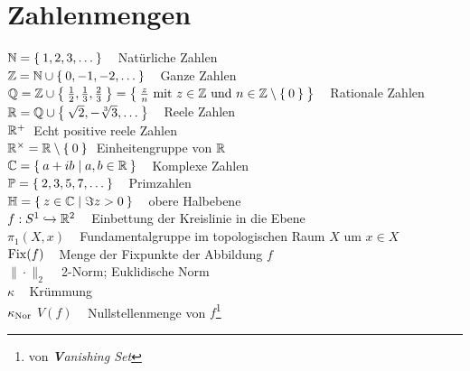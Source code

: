 \section*{Zahlenmengen}
$\mathbb{N} = \Set{1, 2, 3, \dots} \;\;\;$ Natürliche Zahlen\\
$\mathbb{Z} = \mathbb{N} \cup \Set{0, -1, -2, \dots} \;\;\;$ Ganze Zahlen\\
$\mathbb{Q} = \mathbb{Z} \cup \Set{\frac{1}{2}, \frac{1}{3}, \frac{2}{3}} = \Set{\frac{z}{n} \text{ mit } z \in \ensuremath{\mathbb{Z}}\text{ und } n \in \ensuremath{\mathbb{Z}}\setminus \Set{0}} \;\;\;$ Rationale Zahlen\\
$\mathbb{R} = \mathbb{Q} \cup \Set{\sqrt{2}, -\sqrt[3]{3}, \dots}\;\;\;$ Reele Zahlen\\
$\mathbb{R}^+\;$ Echt positive reele Zahlen\\
$\mathbb{R}^\times = \mathbb{R} \setminus \Set{0} \;$ Einheitengruppe von $\mathbb{R}$\\
$\mathbb{C} = \Set{a+ib|a,b \in \ensuremath{\mathbb{R}}}\;\;\;$ Komplexe Zahlen\\
$\mathbb{P} = \Set{2, 3, 5, 7, \dots}\;\;\;$ Primzahlen\\
$\mathbb{H} = \Set{z \in \ensuremath{\mathbb{C}}| \Im{z} > 0}\;\;\;$ obere Halbebene\\

$f:S^1 \hookrightarrow \mathbb{R}^2\;\;\;$ Einbettung der Kreislinie in die Ebene\\
$\pi_1(X,x)\;\;\;$ Fundamentalgruppe im topologischen Raum $X$ um $x \in X$\\
$\operatorname{Fix}(f)\;\;\;$ Menge der Fixpunkte der Abbildung $f$\\
$\|\cdot\|_2\;\;\;$ 2-Norm; Euklidische Norm\\
$\kappa\;\;\;$ Krümmung\\
$\kappa_{\textnormal{Nor}}$
$V(f)\;\;\;$ Nullstellenmenge von $f$\footnote{von \textit{\textbf{V}anishing Set}}

